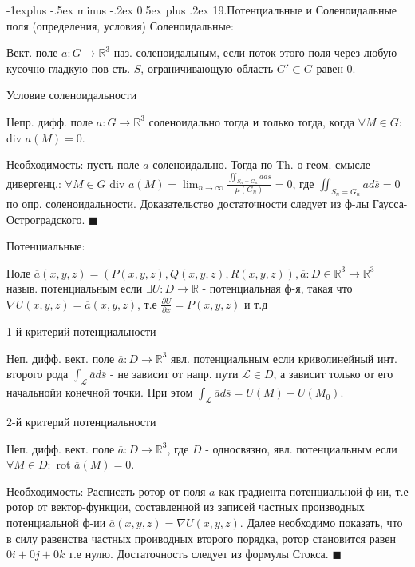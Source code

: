 \documentclass[unicode,10pt, landscape]{article}
\makeatletter
\renewcommand{\subsection}{\@startsection{subsection}{2}{0mm}%
                                {-1explus -.5ex minus -.2ex}%
                                {0.5ex plus .2ex}%
                                {\normalfont\normalsize\bfseries}}
\newenvironment{Proof} %
{\par\noindent{\bf Док-во:}} %
{\hfill$\scriptstyle\blacksquare$}
\makeatother
\begin{document}
\begin{multicols}{4}
 \subsection{19.Потенциальные и Соленоидальные поля (определения, условия)}
 Соленоидальные:
 \begin{Def}
  Вект. поле $a: G \to \mathbb{R}^3$ наз. соленоидальным, если поток этого поля через любую кусочно-гладкую пов-сть. $S$, ограничивающую область $G' \subset G$ равен 0.
 \end{Def}
 Условие соленоидальности
 \begin{Th}
  Непр. дифф. поле $a : G \to \mathbb{R}^3$ соленоидально тогда и только тогда, когда $\forall M \in G : $ div $a(M) = 0$.
  \begin{Proof}
   Необходимость: пусть поле $a$ соленоидально. Тогда по Th. о геом. смысле дивергенц.: $\forall M \in G $ div $a(M) = \lim_{n\to\infty}\frac{\iint_{S_n = G_n} ad\overline{s}}{\mu(G_n)} = 0$, где $\iint_{S_n = G_n} ad\overline{s} = 0$ по опр. соленоидальности.
   Доказательство достаточности следует из ф-лы Гаусса-Остроградского.
  \end{Proof}
 \end{Th}
 Потенциальные:
 \begin{Def}
  Поле $\overline{a}(x, y, z) = (P(x, y, z), Q(x, y, z), R(x, y, z)), \overline{a} : D \in \mathbb{R}^3 \to \mathbb{R}^3$ назыв. потенциальным если $\exists U: D \to \mathbb{R}$ - потенциальная ф-я, такая что $\nabla U(x, y, z) = \overline{a}(x, y, z)$, т.е $\frac{\partial U}{\partial x} = P(x, y, z)$ и т.д
 \end{Def}
 1-й критерий потенциальности
 \begin{Th}
  Неп. дифф. вект. поле $\overline{a}: D \to \mathbb{R}^3$ явл. потенциальным если криволинейный инт. второго рода $\int_{\mathcal{L}}\overline{a}d\overline{s}$ - не зависит от напр. пути $\mathcal{L} \in D$, а зависит только от его начальнойи конечной точки. При этом $\int_{\mathcal{L}}\overline{a}d\overline{s} = U(M) - U(M_0)$.
 \end{Th}
 2-й критерий потенциальности
 \begin{Th}
  Неп. дифф. вект. поле $\overline{a}: D \to \mathbb{R}^3$, где $D$ - односвязно, явл. потенциальным если $\forall M \in D: $ rot $\overline{a}(M) = 0$.
  \begin{Proof}
   Необходимость: Расписать ротор от поля $\overline{a}$ как градиента потенциальной ф-ии, т.е ротор от вектор-функции, составленной из записей частных производных потенциальной ф-ии $\overline{a}(x, y, z) = \nabla U(x, y, z)$. Далее необходимо показать, что в силу равенства частных проиводных второго порядка, ротор становится равен $0i + 0j + 0k$ т.е нулю.
   Достаточность следует из формулы Стокса.
  \end{Proof}
 \end{Th}

\end{multicols}
\end{document}
